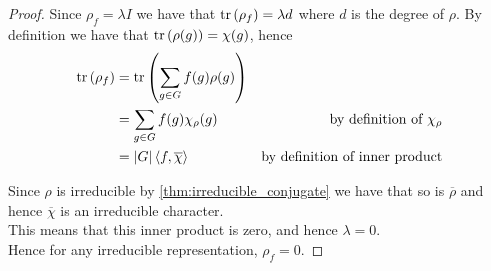 \documentclass{beamer}
\newcommand{\abs}[1]{\left\lvert #1 \right\rvert}
\newcommand{\inner}[2]{\left\langle #1, #2 \right\rangle}
\newcommand{\tr}[1]{\textnormal{tr}\left(#1\right)}
\newcommand{\conj}[1]{\overline{#1}}
\begin{document}
\begin{frame}
\begin{proof}
            Since $\rho_f = \lambda I$ we have that $\tr{\rho_f} = \lambda d$ where $d$ is the degree of $\rho$.
            By definition we have that $\tr{\rho(g)} = \chi(g)$, hence
            \begin{align*}
            \tr{\rho_f} &= \tr{\sum_{g \in G} f(g) \rho(g)}\\
            &= \sum_{g \in G} f(g) \chi_{\rho}(g) & \text{by definition of $\chi_\rho$}\\
            &= \abs{G}\inner{f}{\conj{\chi}} &\text{by definition of inner product}
            \end{align*}

            Since $\rho$ is irreducible by \ref{thm:irreducible_conjugate} we have that so is $\conj{\rho}$ and hence $\conj{\chi}$ is an irreducible character.\\
            This means that this inner product is zero, and hence $\lambda = 0$.\\
            Hence for any irreducible representation, $\rho_f = 0$.
        \end{proof}
\end{frame}
\end{document}
